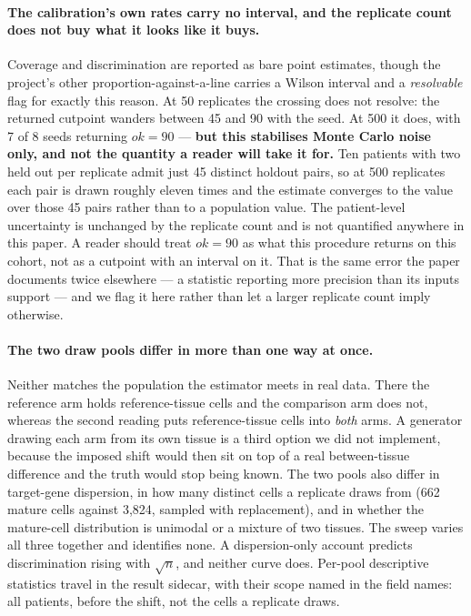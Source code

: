 \iffull\else
\paragraph{The calibration's own rates carry no interval, and the replicate
count does not buy what it looks like it buys.} Coverage and discrimination are
reported as bare point estimates, though the project's other
proportion-against-a-line carries a Wilson interval and a \emph{resolvable} flag
for exactly this reason. At 50 replicates the crossing does not resolve: the
returned cutpoint wanders between 45 and 90 with the seed. At 500 it does, with
7 of 8 seeds returning $ok = 90$ --- \textbf{but this stabilises Monte Carlo
noise only, and not the quantity a reader will take it for.} Ten patients with
two held out per replicate admit just 45 distinct holdout pairs, so at 500
replicates each pair is drawn roughly eleven times and the estimate converges to
the value over those 45 pairs rather than to a population value. The
patient-level uncertainty is unchanged by the replicate count and is not
quantified anywhere in this paper. A reader should treat $ok = 90$ as what this
procedure returns on this cohort, not as a cutpoint with an interval on it. That
is the same error the paper documents twice elsewhere --- a statistic reporting
more precision than its inputs support --- and we flag it here rather than let a
larger replicate count imply otherwise.
\fi

\paragraph{The two draw pools differ in more than one way at once.} Neither
matches the population the estimator meets in real data. There the reference arm
holds reference-tissue cells and the comparison arm does not, whereas the second
reading puts reference-tissue cells into \emph{both} arms. A generator drawing
each arm from its own tissue is a third option we did not implement, because the
imposed shift would then sit on top of a real between-tissue difference and the
truth would stop being known. The two pools also differ in target-gene
dispersion, in how many distinct cells a replicate draws from (662 mature cells
against 3{,}824, sampled with replacement), and in whether the mature-cell
distribution is unimodal or a mixture of two tissues. The sweep varies all three
together and identifies none. A dispersion-only account predicts discrimination
rising with $\sqrt{n}$, and neither curve does. Per-pool descriptive statistics
travel in the result sidecar, with their scope named in the field names: all
patients, before the shift, not the cells a replicate draws.

